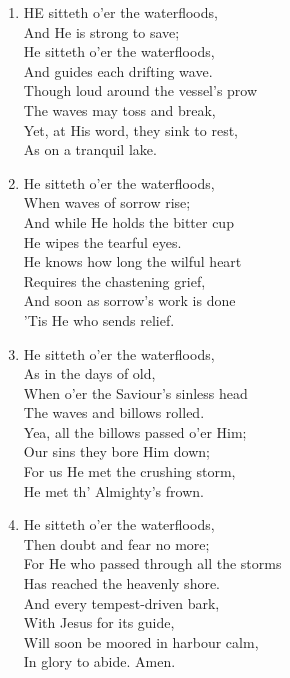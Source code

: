 \begin{enumerate}
    \item HE sitteth o'er the waterfloods, \\
        And He is strong to save; \\
        He sitteth o'er the waterfloods, \\
        And guides each drifting wave. \\
        Though loud around the vessel's prow \\
        The waves may toss and break, \\
        Yet, at His word, they sink to rest, \\
        As on a tranquil lake.

    \item He sitteth o'er the waterfloods, \\
        When waves of sorrow rise; \\
        And while He holds the bitter cup \\
        He wipes the tearful eyes. \\
        He knows how long the wilful heart \\
        Requires the chastening grief, \\
        And soon as sorrow's work is done \\
        'Tis He who sends relief.

    \item He sitteth o'er the waterfloods, \\
        As in the days of old, \\
        When o'er the Saviour's sinless head \\
        The waves and billows rolled. \\
        Yea, all the billows passed o'er Him; \\
        Our sins they bore Him down; \\
        For us He met the crushing storm, \\
        He met th' Almighty's frown.

    \item He sitteth o'er the waterfloods, \\
        Then doubt and fear no more; \\
        For He who passed through all the storms \\
        Has reached the heavenly shore. \\
        And every tempest-driven bark, \\
        With Jesus for its guide, \\
        Will soon be moored in harbour calm, \\
        In glory to abide. Amen.

\end{enumerate}

